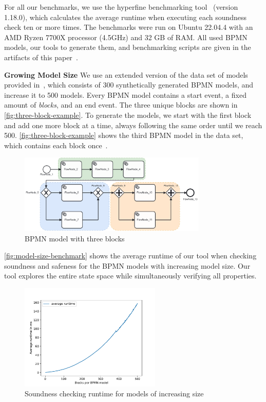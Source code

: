 \documentclass[runningheads]{llncs}
\newcommand{\subpart}[1]{\vspace{1em}\noindent\textbf{#1}}
\begin{document}
For all our benchmarks, we use the hyperfine benchmarking tool~\cite{peterHyperfine2023} (version 1.18.0), which calculates the average runtime when executing each soundness check ten or more times.
The benchmarks were run on Ubuntu 22.04.4 with an AMD Ryzen 7700X processor (4.5GHz) and 32 GB of RAM.
All used BPMN models, our tools to generate them, and benchmarking scripts are given in the artifacts of this paper~\cite{noauthorgivenBPM2024Artifacts2024}.

\subpart{Growing Model Size}
We use an extended version of the data set of models provided in~\cite{krauterHigherorderTransformationApproach2023}, which consists of 300 synthetically generated BPMN models, and increase it to 500 models.
Every BPMN model contains a start event, a fixed amount of \textit{blocks}, and an end event.
The three unique blocks are shown in \autoref{fig:three-block-example}.
To generate the models, we start with the first block and add one more block at a time, always following the same order until we reach 500.
\autoref{fig:three-block-example} shows the third BPMN model in the data set, which contains each block once~\cite{krauterHigherorderTransformationApproach2023}.

\begin{figure}[ht]
	\centering
	\includegraphics[width=0.8\textwidth]{images/three-blocks}
	\caption{BPMN model with three blocks~\cite{krauterHigherorderTransformationApproach2023}}
	\label{fig:three-block-example}
\end{figure}

\autoref{fig:model-size-benchmark} shows the average runtime of our tool when checking soundness and safeness for the BPMN models with increasing model size.
Our tool explores the entire state space while simultaneously verifying all properties.

\begin{figure}[ht]
	\centering
	\includegraphics[width=0.6\textwidth]{images/model-size-benchmark}
	\caption{Soundness checking runtime for models of increasing size}
	\label{fig:model-size-benchmark}
\end{figure}
\end{document}
